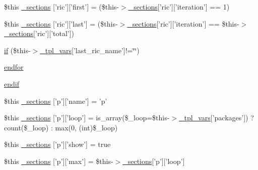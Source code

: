 \begin{DoxyCompactItemize}
\item 
\$this \hyperlink{_06_06-39_05_06_06-392581648_05top__frame_8tpl_8php_a3f72976bef23ba688ea9ceee6bc5a954}{\-\_\-sections} \mbox{[}'ric'\mbox{]}\mbox{[}'first'\mbox{]} = (\$this-\/$>$\hyperlink{_06_06127_05_06_0612781687_05pkgelementindex_8tpl_8php_a9e3d26b39edfe29c3f29b8035ef33828}{\-\_\-sections}\mbox{[}'ric'\mbox{]}\mbox{[}'iteration'\mbox{]} == 1)
\item 
\$this \hyperlink{_06_06-39_05_06_06-392581648_05top__frame_8tpl_8php_aeba2968decfb6f89a9643b97564dcfa4}{\-\_\-sections} \mbox{[}'ric'\mbox{]}\mbox{[}'last'\mbox{]} = (\$this-\/$>$\hyperlink{_06_06127_05_06_0612781687_05pkgelementindex_8tpl_8php_a9e3d26b39edfe29c3f29b8035ef33828}{\-\_\-sections}\mbox{[}'ric'\mbox{]}\mbox{[}'iteration'\mbox{]} == \$this-\/$>$\hyperlink{_06_06127_05_06_0612781687_05pkgelementindex_8tpl_8php_a9e3d26b39edfe29c3f29b8035ef33828}{\-\_\-sections}\mbox{[}'ric'\mbox{]}\mbox{[}'total'\mbox{]})
\item 
\hyperlink{_06_06-39_05_06_06-392581648_05top__frame_8tpl_8php_a4f3fb44bfc7eee38b23bc4dd9a53a3a1}{if} (\$this-\/$>$\hyperlink{_06_06127_05_06_0612781687_05pkgelementindex_8tpl_8php_a4a4846d8e68d455590131a05697f67a3}{\-\_\-tpl\-\_\-vars}\mbox{[}'last\-\_\-ric\-\_\-name'\mbox{]}!=\char`\"{}\char`\"{})
\item 
\hyperlink{_06_06-39_05_06_06-392581648_05top__frame_8tpl_8php_ae8fdc27183f296411bac00ed522ee1ac}{endfor}
\item 
\hyperlink{_06_06-39_05_06_06-392581648_05top__frame_8tpl_8php_a82cd33ca97ff99f2fcc5e9c81d65251b}{endif}
\item 
\$this \hyperlink{_06_06-39_05_06_06-392581648_05top__frame_8tpl_8php_ac23b0b1d4f3c081e87a726b494bf863e}{\-\_\-sections} \mbox{[}'p'\mbox{]}\mbox{[}'name'\mbox{]} = 'p'
\item 
\$this \hyperlink{_06_06-39_05_06_06-392581648_05top__frame_8tpl_8php_acf112e73369b5d57a5dd5027c069ef61}{\-\_\-sections} \mbox{[}'p'\mbox{]}\mbox{[}'loop'\mbox{]} = is\-\_\-array(\$\-\_\-loop=\$this-\/$>$\hyperlink{_06_06127_05_06_0612781687_05pkgelementindex_8tpl_8php_a4a4846d8e68d455590131a05697f67a3}{\-\_\-tpl\-\_\-vars}\mbox{[}'packages'\mbox{]}) ? count(\$\-\_\-loop) \-: max(0, (int)\$\-\_\-loop)
\item 
\$this \hyperlink{_06_06-39_05_06_06-392581648_05top__frame_8tpl_8php_a59f101f9fd9747a4a1221916ee363795}{\-\_\-sections} \mbox{[}'p'\mbox{]}\mbox{[}'show'\mbox{]} = true
\item 
\$this \hyperlink{_06_06-39_05_06_06-392581648_05top__frame_8tpl_8php_ab9459d9765bffe6e71f98da075f4db9c}{\-\_\-sections} \mbox{[}'p'\mbox{]}\mbox{[}'max'\mbox{]} = \$this-\/$>$\hyperlink{_06_06127_05_06_0612781687_05pkgelementindex_8tpl_8php_a9e3d26b39edfe29c3f29b8035ef33828}{\-\_\-sections}\mbox{[}'p'\mbox{]}\mbox{[}'loop'\mbox{]}

\end{DoxyCompactItemize}
